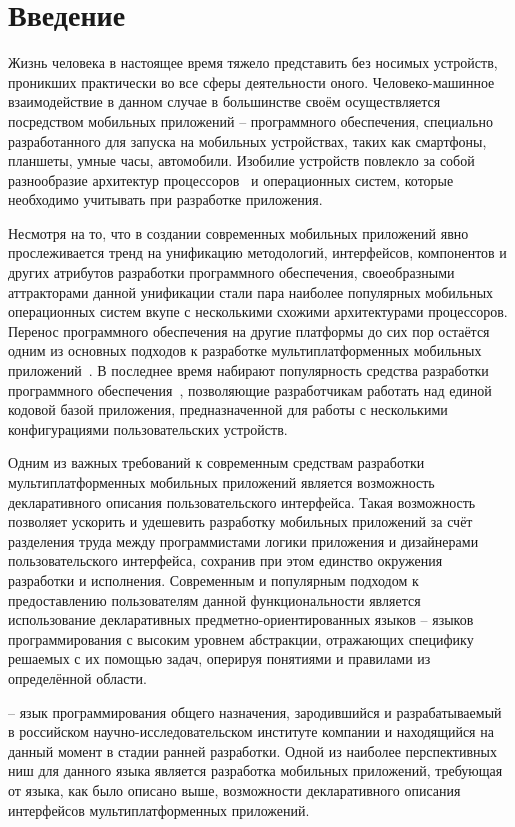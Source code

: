 \section*{Введение}
Жизнь человека в настоящее время тяжело представить без носимых устройств,
проникших практически во все сферы деятельности оного.
Человеко-машинное взаимодействие в данном случае в большинстве своём
осуществляется посредством мобильных приложений -- программного обеспечения, специально разработанного для запуска на мобильных устройствах, таких как
смартфоны, планшеты, умные часы, автомобили.
Изобилие устройств повлекло за собой разнообразие архитектур
процессоров~\cite{cpu-arches, mobile-phones-cpu-trends} и операционных систем, которые необходимо учитывать при разработке приложения.

Несмотря на то, что в создании современных мобильных приложений явно
прослеживается тренд на унификацию методологий, интерфейсов, компонентов и других атрибутов разработки программного обеспечения, своеобразными
аттракторами данной унификации стали пара наиболее популярных мобильных операционных систем вкупе с несколькими схожими архитектурами процессоров. 
Перенос программного обеспечения на другие платформы до сих пор остаётся одним
из основных подходов к разработке мультиплатформенных мобильных
приложений~\cite{mob-apps-approaches}.
В последнее время набирают популярность средства разработки программного
обеспечения~\cite{kotlin-homepage,swift-homepage,flutter-homepage,
reactnative-homepage, vuenative-homepage}, позволяющие разработчикам работать
над единой кодовой базой приложения, предназначенной для работы с несколькими
конфигурациями пользовательских устройств.

Одним из важных требований к современным средствам разработки
мультиплатформенных мобильных приложений является возможность декларативного
описания пользовательского интерфейса.
Такая возможность позволяет ускорить и удешевить разработку мобильных
приложений за счёт разделения труда между программистами логики приложения и
дизайнерами пользовательского интерфейса, сохранив при этом единство окружения
разработки и исполнения.
Современным и популярным подходом к предоставлению пользователям данной
функциональности является использование декларативных
предметно-ориентированных языков -- языков программирования с высоким уровнем
абстракции, отражающих специфику решаемых с их помощью задач, оперируя понятиями и правилами из определённой области.

 -- язык программирования общего назначения, зародившийся и
разрабатываемый в российском научно-исследовательском институте компании
 и находящийся на данный момент в стадии ранней разработки.
Одной из наиболее перспективных ниш для данного языка является разработка
мобильных приложений, требующая от языка, как было описано выше, возможности
декларативного описания интерфейсов мультиплатформенных приложений.